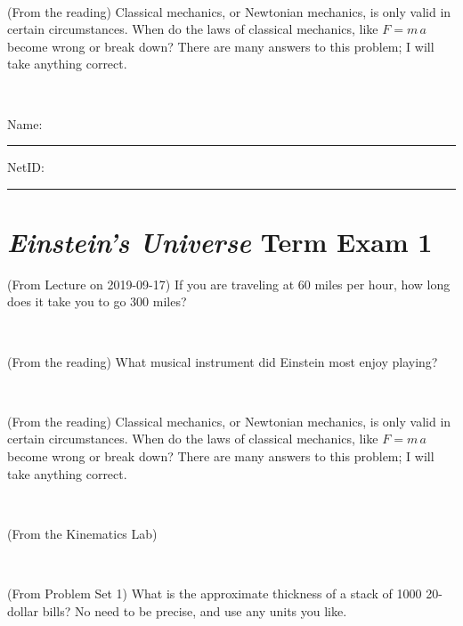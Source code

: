 \documentclass[12pt, letterpaper]{article}
\begin{document}
\vfill ~

\begin{problem} (From the reading)
Classical mechanics, or Newtonian mechanics, is only valid in certain
circumstances. When do the laws of classical mechanics, like $F =
m\,a$ become wrong or break down? There are many answers to this
problem; I will take anything correct.
\end{problem}


\vfill ~


\cleardoublepage



\noindent
Name: \rule[-1ex]{0.60\textwidth}{0.1pt}
NetID: \rule[-1ex]{0.20\textwidth}{0.1pt}

\section*{\textsl{Einstein's Universe} Term Exam 1}
\setcounter{problem}{1}


\begin{problem} (From Lecture on 2019-09-17)
If you are traveling at 60 miles per hour, how long does
it take you to go 300 miles?
\end{problem}


\vfill ~

\begin{problem} (From the reading)
What musical instrument did Einstein most enjoy playing?
\end{problem}


\vfill ~

\begin{problem} (From the reading)
Classical mechanics, or Newtonian mechanics, is only valid in certain
circumstances. When do the laws of classical mechanics, like $F =
m\,a$ become wrong or break down? There are many answers to this
problem; I will take anything correct.
\end{problem}


\vfill ~

\begin{problem} (From the Kinematics Lab)

\end{problem}


\vfill ~


\clearpage


\begin{problem} (From Problem Set 1)
What is the approximate thickness of a stack of 1000 20-dollar bills?
No need to be precise, and use any units you like.
\end{problem}
\end{document}
